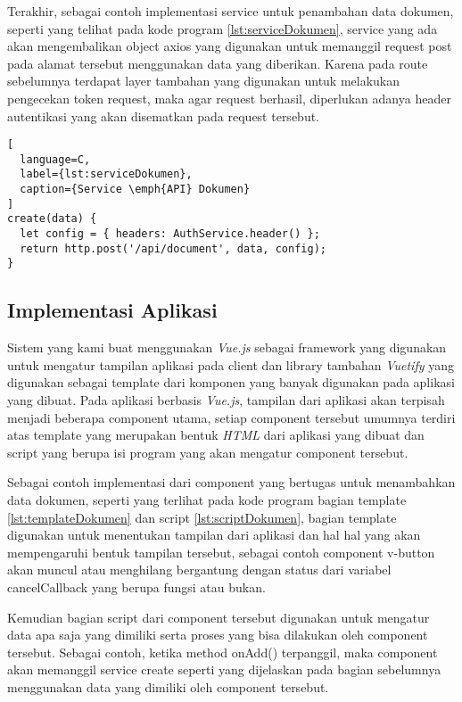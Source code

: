Terakhir, sebagai contoh implementasi service untuk penambahan data dokumen, seperti yang telihat pada kode program \ref{lst:serviceDokumen}, service yang ada akan mengembalikan object axios yang digunakan untuk memanggil request post pada alamat tersebut menggunakan data yang diberikan.
Karena pada route sebelumnya terdapat layer tambahan yang digunakan untuk melakukan pengecekan token request, maka agar request berhasil, diperlukan adanya header autentikasi yang akan disematkan pada request tersebut.
\vspace{0.5ex}

\begin{lstlisting}[
  language=C,
  label={lst:serviceDokumen},
  caption={Service \emph{API} Dokumen}
]
create(data) {
  let config = { headers: AuthService.header() };
  return http.post('/api/document', data, config);
}
\end{lstlisting}
\vspace{0.5ex}

\subsection{Implementasi Aplikasi}
\vspace{1ex}

Sistem yang kami buat menggunakan \emph{Vue.js} sebagai framework yang digunakan untuk mengatur tampilan aplikasi pada client dan library tambahan \emph{Vuetify} yang digunakan sebagai template dari komponen yang banyak digunakan pada aplikasi yang dibuat.
Pada aplikasi berbasis \emph{Vue.js}, tampilan dari aplikasi akan terpisah menjadi beberapa component utama, setiap component tersebut umumnya terdiri atas template yang merupakan bentuk \emph{HTML} dari aplikasi yang dibuat dan script yang berupa isi program yang akan mengatur component tersebut.
\vspace{0.5ex}

Sebagai contoh implementasi dari component yang bertugas untuk menambahkan data dokumen, seperti yang terlihat pada kode program bagian template \ref{lst:templateDokumen} dan script \ref{lst:scriptDokumen}, bagian template digunakan untuk menentukan tampilan dari aplikasi dan hal hal yang akan mempengaruhi bentuk tampilan tersebut, sebagai contoh component v-button akan muncul atau menghilang bergantung dengan status dari variabel cancelCallback yang berupa fungsi atau bukan.
\vspace{0.5ex}

Kemudian bagian script dari component tersebut digunakan untuk mengatur data apa saja yang dimiliki serta proses yang bisa dilakukan oleh component tersebut.
Sebagai contoh, ketika method onAdd() terpanggil, maka component akan memanggil service create seperti yang dijelaskan pada bagian sebelumnya menggunakan data yang dimiliki oleh component tersebut.
\vspace{0.5ex}

